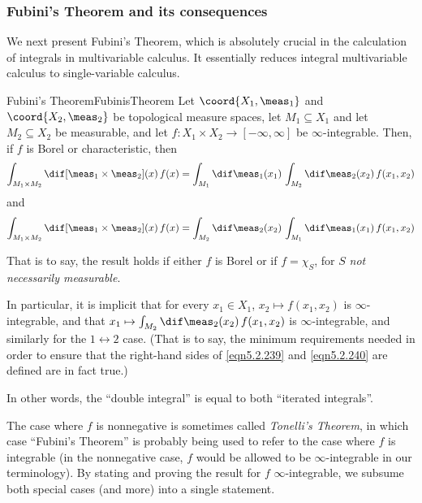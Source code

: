 \subsubsection{Fubini's Theorem and its consequences}

We next present Fubini's Theorem, which is absolutely crucial in the calculation of integrals in multivariable calculus.  It essentially reduces integral multivariable calculus to single-variable calculus.
\begin{thm}{Fubini's Theorem}{FubinisTheorem}
Let $\coord{X_1,\meas _1}$ and $\coord{X_2,\meas _2}$ be topological measure spaces, let $M_1\subseteq X_1$ and let $M_2\subseteq X_2$ be measurable, and let $f\colon X_1\times X_2\rightarrow [-\infty ,\infty ]$ be $\infty$-integrable.  Then, if $f$ is Borel or characteristic, then
{\footnotesize
\begin{equation}\label{eqn5.2.239}
\int _{M_1\times M_2}\dif [\meas _1\times \meas _2](x)\, f(x)=\int _{M_1}\dif \meas _1(x_1)\, \int _{M_2}\dif \meas _2(x_2)\, f(x_1,x_2)
\end{equation}
}
and
{\footnotesize
\begin{equation}\label{eqn5.2.240}
\int _{M_1\times M_2}\dif [\meas _1\times \meas _2](x)\, f(x)=\int _{M_2}\dif \meas _2(x_2)\, \int _{M_1}\dif \meas _1(x_1)\, f(x_1,x_2)
\end{equation}
}
\begin{rmk}
That is to say, the result holds if either $f$ is Borel or if $f=\chi _S$, for $S$ \emph{not necessarily measurable}.
\end{rmk}
\begin{rmk}
In particular, it is implicit that for every $x_1\in X_1$, $x_2\mapsto f(x_1,x_2)$ is $\infty$-integrable, and that $x_1\mapsto \int _{M_2}\dif \meas _2(x_2)\, f(x_1,x_2)$ is $\infty$-integrable, and similarly for the $1\leftrightarrow 2$ case.  (That is to say, the minimum requirements needed in order to ensure that the right-hand sides of \eqref{eqn5.2.239} and \eqref{eqn5.2.240} are defined are in fact true.)
\end{rmk}
\begin{rmk}
In other words, the ``double integral'' is equal to both ``iterated integrals''.
\end{rmk}
\begin{rmk}
The case where $f$ is nonnegative is sometimes called \emph{Tonelli's Theorem}, in which case ``Fubini's Theorem'' is probably being used to refer to the case where $f$ is integrable (in the nonnegative case, $f$ would be allowed to be $\infty$-integrable in our terminology).  By stating and proving the result for $f$ $\infty$-integrable, we subsume both special cases (and more) into a single statement.

\end{rmk}
\end{thm}
